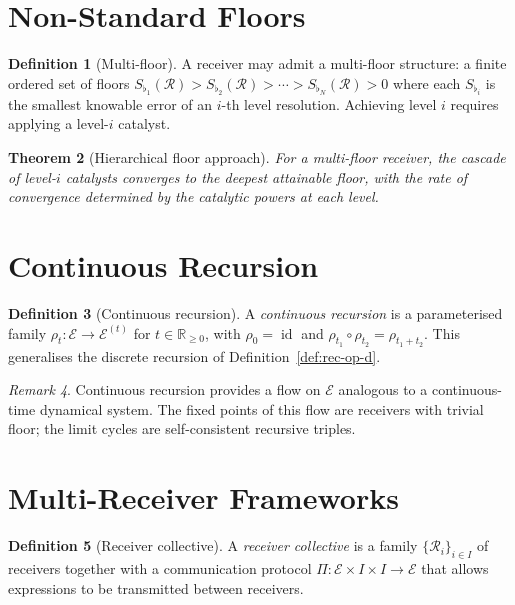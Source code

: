 \documentclass[twocolumn,11pt,a4paper]{article}
\theoremstyle{thmstyle}
\newtheorem{theorem}{Theorem}[section]
\theoremstyle{thmstyle}
\theoremstyle{definition}
\newtheorem{definition}[theorem]{Definition}
\theoremstyle{remark}
\newtheorem{remark}[theorem]{Remark}
\DeclareMathOperator{\id}{id}
\newcommand{\Real}{\mathbb{R}}
\newcommand{\Expr}{\mathcal{E}}
\newcommand{\receiver}{\mathcal{R}}
\newcommand{\Sfloor}{S_{\flat}}
\begin{document}
\section{Non-Standard Floors}
\label{sec:non-standard-floors}

\begin{definition}[Multi-floor]\label{def:multi-floor}
A receiver may admit a multi-floor structure: a
finite ordered set of floors
$\Sfloor_{1}(\receiver) > \Sfloor_{2}(\receiver) >
\cdots > \Sfloor_{N}(\receiver) > 0$ where each
$\Sfloor_{i}$ is the smallest knowable error of an
$i$-th level resolution.  Achieving level $i$
requires applying a level-$i$ catalyst.
\end{definition}

\begin{theorem}[Hierarchical floor approach]
\label{thm:hier-floor}
For a multi-floor receiver, the cascade of
level-$i$ catalysts converges to the deepest
attainable floor, with the rate of convergence
determined by the catalytic powers at each
level.
\end{theorem}

\section{Continuous Recursion}
\label{sec:cont-rec}

\begin{definition}[Continuous recursion]
\label{def:cont-rec}
A \emph{continuous recursion} is a parameterised
family $\rho_{t}: \Expr \to \Expr^{(t)}$ for
$t \in \Real_{\geq 0}$, with $\rho_{0} = \id$ and
$\rho_{t_{1}} \circ \rho_{t_{2}} = \rho_{t_{1} +
t_{2}}$.  This generalises the discrete
recursion of Definition~\ref{def:rec-op-d}.
\end{definition}

\begin{remark}\label{rem:cont-rec}
Continuous recursion provides a flow on $\Expr$
analogous to a continuous-time dynamical system.
The fixed points of this flow are receivers with
trivial floor; the limit cycles are
self-consistent recursive triples.
\end{remark}

\section{Multi-Receiver Frameworks}
\label{sec:multi-receiver}

\begin{definition}[Receiver collective]
\label{def:rec-coll}
A \emph{receiver collective} is a family
$\{\receiver_{i}\}_{i \in I}$ of receivers
together with a communication protocol
$\Pi: \Expr \times I \times I \to \Expr$ that
allows expressions to be transmitted between
receivers.
\end{definition}
\end{document}
